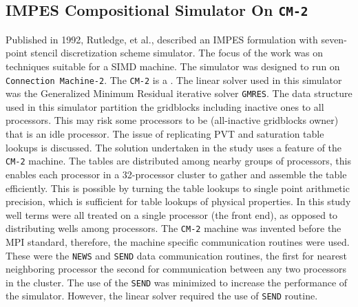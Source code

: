 \documentclass[barcolor=BrickRed,nocopyright,nolists]{asmejour}
\begin{document}
\subsection{IMPES Compositional Simulator On \texttt{CM-2}}
Published in 1992, Rutledge, et al., described an IMPES formulation with seven-point stencil discretization scheme simulator. The focus of the work was on techniques suitable for a SIMD machine. The simulator was designed to run on \texttt{Connection Machine-2}.
The \texttt{CM-2} is a . The linear solver used in this simulator was the Generalized Minimum Residual iterative solver \texttt{GMRES}. The data structure used in this simulator partition the gridblocks including inactive ones to all processors. This may risk some
processors to be (all-inactive gridblocks owner) that is an idle processor. The issue of replicating PVT and saturation table lookups is discussed. The solution undertaken in the study uses a feature of the \texttt{CM-2} machine. The tables are distributed among
nearby groups of processors, this enables each processor in a 32-processor cluster to gather and assemble the table efficiently. This is possible by turning the table lookups to single point arithmetic precision, which is sufficient for table lookups of physical properties.
In this study well terms were all treated on a single processor (the front end), as opposed to distributing wells among processors. The \texttt{CM-2} machine was invented before the MPI standard, therefore, the machine specific communication routines were used. These were the
\texttt{NEWS} and \texttt{SEND} data communication routines, the first for nearest neighboring processor the second for communication between any two processors in the cluster. The use of the \texttt{SEND} was minimized to increase the performance of the simulator. However, the
linear solver required the use of \texttt{SEND} routine.
\end{document}
